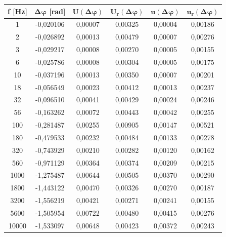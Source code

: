 \begin{table}[!ht]
    \centering
    \begin{tabular}{|c|c|c|c|c|c|}
    \hline

        \textbf{f [Hz]} & $\bm{\Delta\varphi}$ \textbf{[rad]} & $\bm{U(\Delta\varphi)}$ & $\bm{U_r(\Delta\varphi)}$ & $\bm{u(\Delta\varphi)}$ & $\bm{u_r(\Delta\varphi)}$ \\ \hline

        1 & -0,020106 & 0,00007 & 0,00325 & 0,00004 & 0,00186 \\ \hline
        2 & -0,026892 & 0,00013 & 0,00479 & 0,00007 & 0,00276 \\ \hline
        3 & -0,029217 & 0,00008 & 0,00270 & 0,00005 & 0,00155 \\ \hline
        6 & -0,025786 & 0,00008 & 0,00304 & 0,00005 & 0,00175 \\ \hline
        10 & -0,037196 & 0,00013 & 0,00350 & 0,00007 & 0,00201 \\ \hline
        18 & -0,056549 & 0,00023 & 0,00412 & 0,00013 & 0,00237 \\ \hline
        32 & -0,096510 & 0,00041 & 0,00429 & 0,00024 & 0,00246 \\ \hline
        56 & -0,163262 & 0,00072 & 0,00443 & 0,00042 & 0,00255 \\ \hline
        100 & -0,281487 & 0,00255 & 0,00905 & 0,00147 & 0,00521 \\ \hline
        180 & -0,479533 & 0,00232 & 0,00484 & 0,00133 & 0,00278 \\ \hline
        320 & -0,743929 & 0,00210 & 0,00282 & 0,00120 & 0,00162 \\ \hline
        560 & -0,971129 & 0,00364 & 0,00374 & 0,00209 & 0,00215 \\ \hline
        1000 & -1,275487 & 0,00644 & 0,00505 & 0,00370 & 0,00290 \\ \hline
        1800 & -1,443122 & 0,00470 & 0,00326 & 0,00270 & 0,00187 \\ \hline
        3200 & -1,556219 & 0,00421 & 0,00271 & 0,00241 & 0,00155 \\ \hline
        5600 & -1,505954 & 0,00722 & 0,00480 & 0,00415 & 0,00276 \\ \hline
        10000 & -1,533097 & 0,00648 & 0,00423 & 0,00372 & 0,00243 \\ \hline
    \end{tabular}
\end{table}
\FloatBarrier
\clearpage